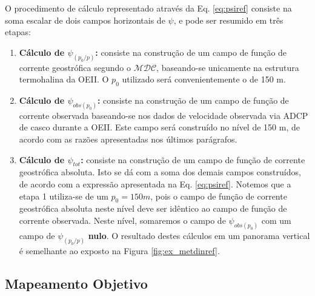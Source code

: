 O procedimento de cálculo representado através da Eq. \ref{eq:psiref} consiste na soma
escalar de dois campos horizontais de $\psi$, e pode ser resumido em três etapas: 

\begin{enumerate}

 \item {\bf Cálculo de $\psi_{(p_0/p)}$:} consiste na construção de um campo de função de corrente
geostrófica segundo o $\mathcal{MDC}$, baseando-se unicamente na estrutura termohalina da OEII. 
O $p_0$ utilizado será convenientemente o de 150 m.
 
 \item {\bf Cálculo de $\psi_{obs(p_0)}$:} consiste na construção de um campo de função de corrente
observada baseando-se nos dados de velocidade observada via ADCP de casco durante a OEII. Este
campo será construído no nível de 150 m, de acordo com as razões apresentadas nos últimos parágrafos. 

 \item {\bf Cálculo de $\psi_{tot}$:} consiste na construção de um campo de função de corrente geostrófica
absoluta. Isto se dá com a soma dos demais campos construídos, de acordo com a expressão
apresentada na Eq. \ref{eq:psiref}. Notemos que a etapa 1 utiliza-se de um $p_0 = 150 m$, pois o campo
de função de corrente geostrófica absoluta neste nível deve ser idêntico ao campo de função de corrente
observada. Neste nível, somaremos o campo de $\psi_{obs(p_0)}$ com um campo de $\psi_{(p_0/p)}$ {\bf nulo}. 
O resultado destes cálculos em um panorama vertical é semelhante ao exposto na Figura \ref{fig:ex_metdinref}.

\end{enumerate}

\subsection{Mapeamento Objetivo} \label{sec:psiref_AO}

